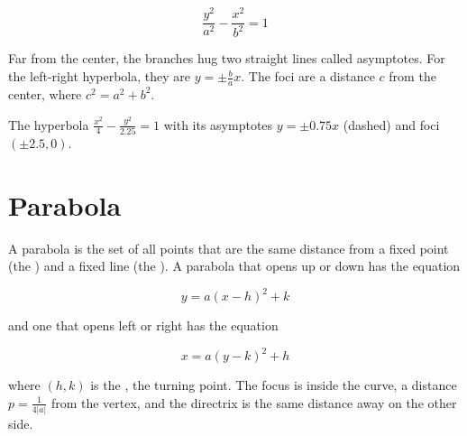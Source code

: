 \begin{equation}
\frac{y^2}{a^2} - \frac{x^2}{b^2} = 1
\end{equation}

Far from the center, the branches hug two straight lines called
asymptotes. For the left-right hyperbola, they are
$y = \pm \frac{b}{a}x$. The foci are a distance $c$ from the center, where
$c^2 = a^2 + b^2$.

\begin{center}

The hyperbola $\frac{x^2}{4} - \frac{y^2}{2.25} = 1$ with its asymptotes
$y = \pm 0.75x$ (dashed) and foci $(\pm 2.5, 0)$.
\end{center}

\section{Parabola}

A parabola is the set of all points that are the same
distance from a fixed point (the ) and a fixed line (the
). A parabola that opens up or down
has the equation

\begin{equation}
y = a(x - h)^2 + k
\end{equation}

and one that opens left or right has the equation

\begin{equation}
x = a(y - k)^2 + h
\end{equation}

where $(h,k)$ is the , the turning point. The focus is
inside the curve, a distance $p = \frac{1}{4|a|}$ from the vertex, and the
directrix is the same distance away on the other side.

\begin{center}
\end{center}

